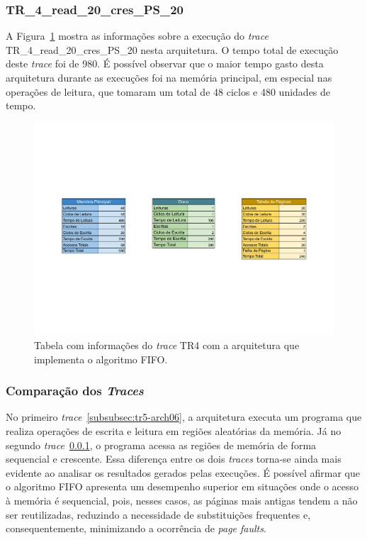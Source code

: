 \documentclass[
	12pt,				%
	oneside,   	        %
	a4paper,			%
	english,			%
	french,				%
	spanish,			%
	brazil,				%
	]{pacotes/abntex2}
\begin{document}
\subsubsection{TR\_4\_read\_20\_cres\_PS\_20}
\label{subsubsec:tr4-arch06}

A Figura~\ref{fig:tr4-arch06} mostra as informações sobre a execução do \textit{trace} TR\_4\_read\_20\_cres\_PS\_20 nesta arquitetura. O tempo total de execução deste \textit{trace} foi de 980.
É possível observar que o maior tempo gasto desta arquitetura durante as execuções foi na memória principal, em especial nas operações de leitura, que tomaram um total de 48 ciclos e 480 unidades de tempo.

\begin{figure}[H]
  \centering
  \includegraphics[scale=0.5]{figuras/Architecture06-TLB(none) TR4.pdf}
  \caption{Tabela com informações do \textit{trace} TR4 com a arquitetura que implementa o algoritmo FIFO.}
  \label{fig:tr4-arch06}
\end{figure}

\subsubsection{Comparação dos \textit{Traces}}
\label{subsubsec:comp-traces-arch6}

No primeiro \textit{trace}~\ref{subsubsec:tr5-arch06}, a arquitetura executa um programa que realiza operações de escrita e leitura em regiões aleatórias da memória. Já no segundo \textit{trace}~\ref{subsubsec:tr4-arch06}, o programa acessa as regiões de memória de forma sequencial e crescente. Essa diferença entre os dois \textit{traces} torna-se ainda mais evidente ao analisar os resultados gerados pelas execuções. É possível afirmar que o algoritmo FIFO apresenta um desempenho superior em situações onde o acesso à memória é sequencial, pois, nesses casos, as páginas mais antigas tendem a não ser reutilizadas, reduzindo a necessidade de substituições frequentes e, consequentemente, minimizando a ocorrência de \textit{page faults}.
\end{document}
